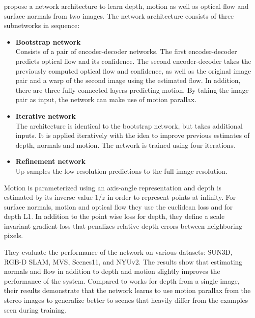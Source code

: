 		\cite{ummenhofer2016demon} propose a network architecture to learn depth, motion as well as optical flow and surface normals from two images.
		The network architecture consists of three subnetworks in sequence:
		\begin{itemize}
			\item \textbf{Bootstrap network}
				\\
				Consists of a pair of encoder-decoder networks.
				The first encoder-decoder predicts optical flow and its confidence.
				The second encoder-decoder takes the previously computed optical flow and confidence, as well as the original image pair and a warp of the second image using the estimated flow.
				In addition, there are three fully connected layers predicting motion.
				By taking the image pair as input, the network can make use of motion parallax.
			\item \textbf{Iterative network}
				\\
				The architecture is identical to the bootstrap network, but takes additional inputs.
				It is applied iteratively with the idea to improve previous estimates of depth, normals and motion.
				The network is trained using four iterations.
			\item \textbf{Refinement network}
				\\
				Up-samples the low resolution predictions to the full image resolution.
		\end{itemize}
		Motion is parameterized using an axis-angle representation and depth is estimated by its inverse value $1 / z$ in order to represent points at infinity.
		For surface normals, motion and optical flow they use the euclidean loss and for depth L1.
		In addition to the point wise loss for depth, they define a scale invariant gradient loss that penalizes relative depth errors between neighboring pixels.
		
		They evaluate the performance of the network on various datasets: {SUN3D}, {RGB-D SLAM}, {MVS}, {Scenes11}, and {NYUv2}.
		The results show that estimating normals and flow in addition to depth and motion slightly improves the performance of the system.
		Compared to works for depth from a single image, their results demonstrate that the network learns to use motion parallax from the stereo images to generalize better to scenes that heavily differ from the examples seen during training.
		
	
		
